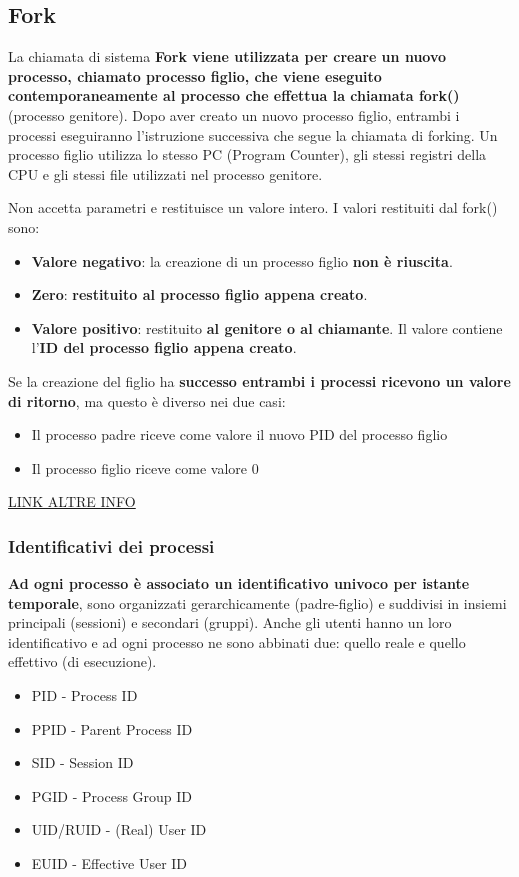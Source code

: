\subsection{Fork}
La chiamata di sistema \textbf{Fork viene utilizzata per creare un nuovo processo, chiamato processo figlio, che viene eseguito contemporaneamente al processo che effettua la chiamata fork()} (processo genitore). Dopo aver creato un nuovo processo figlio, entrambi i processi eseguiranno l'istruzione successiva che segue la chiamata di forking. Un processo figlio utilizza lo stesso PC (Program Counter), gli stessi registri della CPU e gli stessi file utilizzati nel processo genitore.

Non accetta parametri e restituisce un valore intero. I valori restituiti dal fork() sono:
\begin{itemize}

    \item \textbf{Valore negativo}: la creazione di un processo figlio \textbf{non è riuscita}.
    \item \textbf{Zero}: \textbf{restituito al processo figlio appena creato}.
    \item \textbf{Valore positivo}: restituito \textbf{al genitore o al chiamante}. Il valore contiene l'\textbf{ID del processo figlio appena creato}.
\end{itemize}

Se la creazione del figlio ha \textbf{successo entrambi i processi ricevono un valore di ritorno}, ma questo è diverso nei due casi:
\begin{itemize}
    \item Il processo padre riceve come valore il nuovo PID del processo figlio
    \item Il processo figlio riceve come valore 0
\end{itemize} 

\href{https://www.geeksforgeeks.org/fork-system-call/}{LINK ALTRE INFO}

\subsubsection{Identificativi dei processi}
\textbf{Ad ogni processo è associato un identificativo univoco per istante temporale}, sono organizzati gerarchicamente (padre-figlio) e suddivisi in insiemi principali (sessioni) e secondari (gruppi). Anche gli utenti hanno un loro identificativo e ad ogni processo ne sono abbinati due: quello reale e quello effettivo (di esecuzione).
\begin{itemize}
    \item PID - Process ID
    \item PPID - Parent Process ID
    \item SID - Session ID
    \item PGID - Process Group ID
    \item UID/RUID - (Real) User ID
    \item EUID - Effective User ID
\end{itemize}
